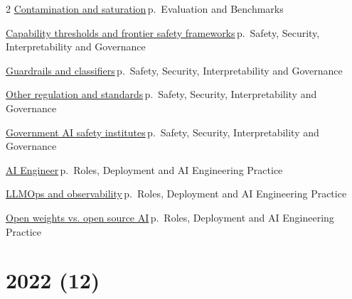 \documentclass[10pt,a4paper,openany]{report}
\begin{document}
\begin{multicols}{2}
\hyperref[c:evals-10]{Contamination and saturation}\,{\color{muted}\scriptsize p.\,\pageref{c:evals-10}} {\color{muted}\scriptsize Evaluation and Benchmarks}\par\vspace{2pt}
\hyperref[c:safety-0]{Capability thresholds and frontier safety frameworks}\,{\color{muted}\scriptsize p.\,\pageref{c:safety-0}} {\color{muted}\scriptsize Safety, Security, Interpretability and Governance}\par\vspace{2pt}
\hyperref[c:safety-5]{Guardrails and classifiers}\,{\color{muted}\scriptsize p.\,\pageref{c:safety-5}} {\color{muted}\scriptsize Safety, Security, Interpretability and Governance}\par\vspace{2pt}
\hyperref[c:safety-12]{Other regulation and standards}\,{\color{muted}\scriptsize p.\,\pageref{c:safety-12}} {\color{muted}\scriptsize Safety, Security, Interpretability and Governance}\par\vspace{2pt}
\hyperref[c:safety-13]{Government AI safety institutes}\,{\color{muted}\scriptsize p.\,\pageref{c:safety-13}} {\color{muted}\scriptsize Safety, Security, Interpretability and Governance}\par\vspace{2pt}
\hyperref[c:practice-1]{AI Engineer}\,{\color{muted}\scriptsize p.\,\pageref{c:practice-1}} {\color{muted}\scriptsize Roles, Deployment and AI Engineering Practice}\par\vspace{2pt}
\hyperref[c:practice-5]{LLMOps and observability}\,{\color{muted}\scriptsize p.\,\pageref{c:practice-5}} {\color{muted}\scriptsize Roles, Deployment and AI Engineering Practice}\par\vspace{2pt}
\hyperref[c:practice-7]{Open weights vs. open source AI}\,{\color{muted}\scriptsize p.\,\pageref{c:practice-7}} {\color{muted}\scriptsize Roles, Deployment and AI Engineering Practice}\par\vspace{2pt}
\end{multicols}
\section{2022 (12)}
\end{document}
